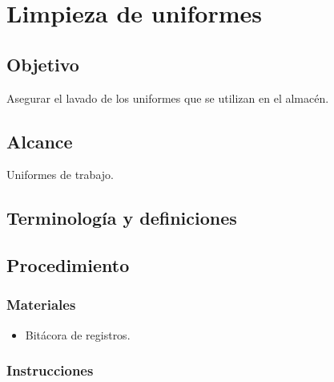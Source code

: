 \thispagestyle{formato-PI}
\renewcommand{\MenorVer}{0}
\renewcommand{\MayorVer}{2}
\renewcommand{\Codigo}{HYS-18-IT}
\renewcommand{\FechaPub}{2023--01}
\renewcommand{\Titulo}{Limpieza de uniformes}

\section{\Titulo}

\subsection{Objetivo}
Asegurar el lavado de los uniformes que se utilizan en el almacén.

\subsection{Alcance}
Uniformes de trabajo.

\subsection{Terminología y definiciones}
\begin{description}
\end{description}

\subsection{Procedimiento}
\subsubsection{Materiales}
\begin{itemize}
	\item Bitácora de registros.
\end{itemize}

\subsubsection{Instrucciones}
